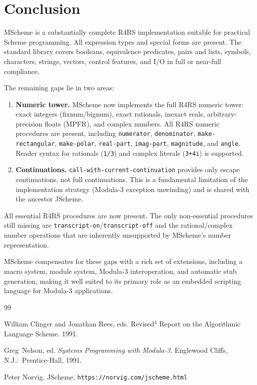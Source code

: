 \documentclass[12pt]{report}
\begin{document}
\chapter{Conclusion}

MScheme is a substantially complete R4RS implementation suitable for
practical Scheme programming.  All expression types and special forms
are present.  The standard library covers booleans, equivalence
predicates, pairs and lists, symbols, characters, strings, vectors,
control features, and I/O in full or near-full compliance.

The remaining gaps lie in two areas:

\begin{enumerate}
\item \textbf{Numeric tower.}  MScheme now implements the full R4RS
  numeric tower: exact integers (fixnum/bignum), exact rationals,
  inexact reals, arbitrary-precision floats (MPFR), and complex
  numbers.  All R4RS numeric procedures are present, including
  {\tt numerator}, {\tt denominator}, {\tt make-rectangular},
  {\tt make-polar}, {\tt real-part}, {\tt imag-part}, {\tt magnitude},
  and {\tt angle}.  Reader syntax for rationals ({\tt 1/3}) and
  complex literals ({\tt 3+4i}) is supported.

\item \textbf{Continuations.}  {\tt call-with-current-continuation}
  provides only escape continuations, not full continuations.  This is
  a fundamental limitation of the implementation strategy (Modula-3
  exception unwinding) and is shared with the ancestor JScheme.
\end{enumerate}

\noindent
All essential R4RS procedures are now present.  The only non-essential
procedures still missing are {\tt transcript-on}/{\tt transcript-off}
and the rational/complex number operations that are inherently
unsupported by MScheme's number representation.

MScheme compensates for these gaps with a rich set of extensions,
including a macro system, module system, Modula-3 interoperation, and
automatic stub generation, making it well suited to its primary role
as an embedded scripting language for Modula-3 applications.

\begin{thebibliography}{99}

 William Clinger and Jonathan Rees, eds.
Revised$^4$ Report on the Algorithmic Language Scheme.  1991.

 Greg~Nelson, ed.  {\it Systems Programming with Modula-3.}
Englewood Cliffs, N.J.:\ Prentice-Hall, 1991.

 Peter Norvig.  JScheme.
{\tt https://norvig.com/jscheme.html}

\end{thebibliography}
\end{document}
